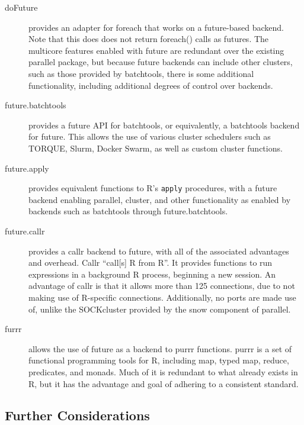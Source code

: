 \documentclass[a4paper,10pt]{article}
\begin{document}
\begin{description}
	\item[doFuture]\cite{bengtsson20do} provides an adapter for
	      foreach\cite{microsoft20} that works on a future-based backend. Note
	      that this does does not return foreach() calls as futures. The
	      multicore features enabled with future are redundant over the
	      existing parallel package, but because future backends can include
	      other clusters, such as those provided by batchtools, there is some
	      additional functionality, including additional degrees of control
	      over backends.
	\item[future.batchtools]\cite{bengtsson19batch} provides a future API
	      for batchtools\cite{lang17}, or equivalently, a batchtools backend
	      for future. This allows the use of various cluster schedulers such
	      as TORQUE, Slurm, Docker Swarm, as well as custom cluster functions.
	\item[future.apply]\cite{bengtsson20apply} provides equivalent
	      functions to R's \texttt{apply} procedures, with a future backend
	      enabling parallel, cluster, and other functionality as enabled by
	      backends such as batchtools through future.batchtools.
	\item[future.callr]\cite{bengtsson19callr} provides a
	      callr\cite{csardi20} backend to future, with all of the associated
	      advantages and overhead. Callr \enquote{call[s] R from R}. It
	      provides functions to run expressions in a background R process,
	      beginning a new session. An advantage of callr is that it allows
	      more than 125 connections, due to not making use of R-specific
	      connections. Additionally, no ports are made use of, unlike the
	      SOCKcluster provided by the snow component of parallel.
	\item[furrr]\cite{vaughan18} allows the use of future as a backend to
	      purrr functions. purrr is a set of functional programming tools for
	      R, including map, typed map, reduce, predicates, and monads. Much of
	      it is redundant to what already exists in R, but it has the
	      advantage and goal of adhering to a consistent standard.
\end{description}

\subsection{Further Considerations}
\label{sec:further-considerations}
\end{document}
